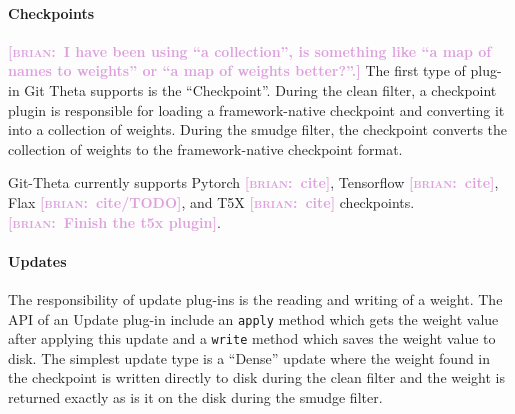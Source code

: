 \documentclass[nohyperref]{article}
\def\code#1{\texttt{#1}}
\theoremstyle{plain}
\theoremstyle{definition}
\theoremstyle{remark}
\newcommand{\brian}[1]{\textcolor{Plum}{\bf\small [\textsc{brian}:~#1]}}
\begin{document}
\paragraph{Checkpoints}

\brian{I have been using ``a collection'', is something like ``a map of names to weights'' or ``a map of weights better?''.}
The first type of plug-in Git Theta supports is the ``Checkpoint''. During the clean filter, a checkpoint plugin is responsible for loading a framework-native checkpoint and converting it into a collection of weights. During the smudge filter, the checkpoint converts the collection of weights to the framework-native checkpoint format.

Git-Theta currently supports Pytorch \brian{cite}, Tensorflow \brian{cite}, Flax \brian{cite/TODO}, and T5X \brian{cite} checkpoints. \brian{Finish the t5x plugin}.





\paragraph{Updates}

The responsibility of update plug-ins is the reading and writing of a weight. The API of an Update plug-in include an \code{apply} method which gets the weight value after applying this update and a \code{write} method which saves the weight value to disk. The simplest update type is a ``Dense'' update where the weight found in the checkpoint is written directly to disk during the clean filter and the weight is returned exactly as is it on the disk during the smudge filter.
\end{document}

